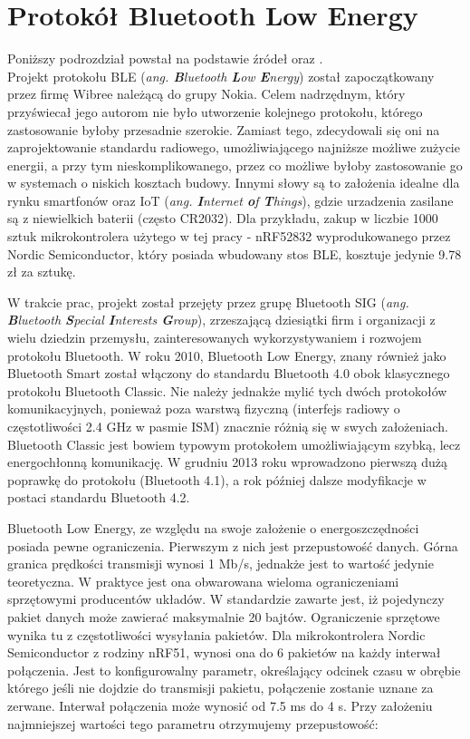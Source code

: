 \section{Protokół Bluetooth Low Energy}
\label{bluetooth}

Poniższy podrozdział powstał na podstawie źródeł \cite{BLE} oraz \cite{inzynierka}.\\

Projekt protokołu BLE (\textit{ang. \textbf{B}luetooth \textbf{L}ow \textbf{E}nergy}) został zapoczątkowany przez firmę Wibree należącą do grupy Nokia. Celem nadrzędnym, który przyświecał jego autorom nie było utworzenie kolejnego protokołu, którego zastosowanie byłoby przesadnie szerokie. Zamiast tego, zdecydowali się oni na zaprojektowanie standardu radiowego, umożliwiającego najniższe możliwe zużycie energii, a przy tym nieskomplikowanego, przez co możliwe byłoby zastosowanie go w systemach o niskich kosztach budowy. Innymi słowy są to założenia idealne dla rynku smartfonów oraz IoT (\textit{ang. \textbf{I}nternet \textbf{o}f \textbf{T}hings}), gdzie urzadzenia zasilane są z niewielkich baterii (często CR2032). Dla przykładu, zakup w liczbie 1000 sztuk mikrokontrolera użytego w tej pracy - nRF52832 wyprodukowanego przez Nordic Semiconductor, który posiada wbudowany stos BLE, kosztuje jedynie 9.78 zł za sztukę.

W trakcie prac, projekt został przejęty przez grupę Bluetooth SIG (\textit{ang. \textbf{B}luetooth \textbf{S}pecial \textbf{I}nterests \textbf{G}roup}), zrzeszającą dziesiątki firm i organizacji z wielu dziedzin przemysłu, zainteresowanych wykorzystywaniem i rozwojem protokołu Bluetooth. W roku 2010, Bluetooth Low Energy, znany również jako Bluetooth Smart został włączony do standardu Bluetooth 4.0 obok klasycznego protokołu Bluetooth Classic. Nie należy jednakże mylić tych dwóch protokołów komunikacyjnych, ponieważ poza warstwą fizyczną (interfejs radiowy o częstotliwości 2.4 GHz w pasmie ISM) znacznie różnią się w swych założeniach. Bluetooth Classic jest bowiem typowym protokołem umożliwiającym szybką, lecz energochłonną komunikację. W grudniu 2013 roku wprowadzono pierwszą dużą poprawkę do protokołu (Bluetooth 4.1), a rok później dalsze modyfikacje w postaci standardu Bluetooth 4.2. 

Bluetooth Low Energy, ze względu na swoje założenie o energoszczędności posiada pewne ograniczenia. Pierwszym z nich jest przepustowość danych. Górna granica prędkości transmisji wynosi 1 Mb/s, jednakże jest to wartość jedynie teoretyczna. W praktyce jest ona obwarowana wieloma ograniczeniami sprzętowymi producentów układów. W standardzie zawarte jest, iż pojedynczy pakiet danych może zawierać maksymalnie 20 bajtów. Ograniczenie sprzętowe wynika tu z częstotliwości wysyłania pakietów. Dla  mikrokontrolera Nordic Semiconductor z rodziny nRF51, wynosi ona do 6 pakietów na każdy interwał połączenia. Jest to konfigurowalny parametr, określający odcinek czasu w obrębie którego jeśli nie dojdzie do transmisji pakietu, połączenie zostanie uznane za zerwane. Interwał połączenia może wynosić od 7.5 ms do 4 s. Przy założeniu najmniejszej wartości tego parametru otrzymujemy przepustowość:

